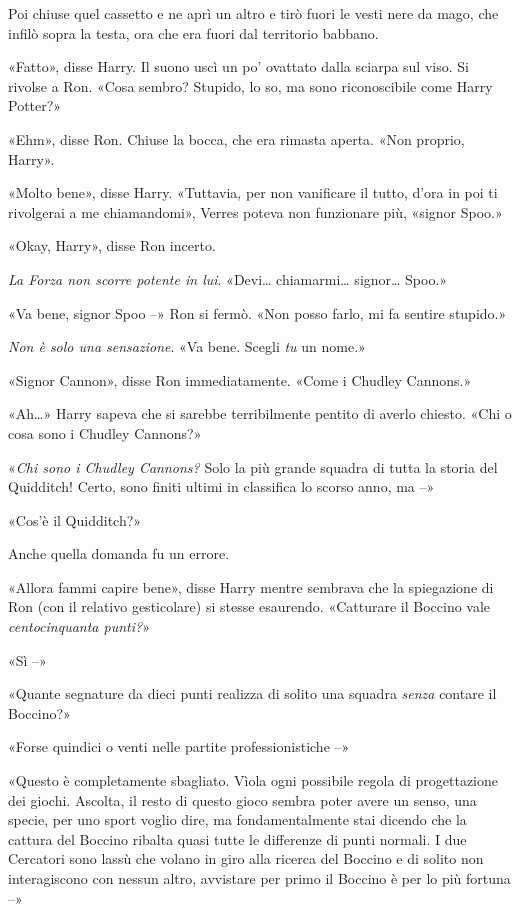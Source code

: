Poi chiuse quel cassetto e ne aprì un altro e tirò fuori le vesti nere da mago, che infilò sopra la testa, ora che era fuori dal territorio babbano.

«Fatto», disse Harry. Il suono uscì un po’ ovattato dalla sciarpa sul viso. Si rivolse a Ron. «Cosa sembro? Stupido, lo so, ma sono riconoscibile come Harry Potter?»

«Ehm», disse Ron. Chiuse la bocca, che era rimasta aperta. «Non proprio, Harry».

«Molto bene», disse Harry. «Tuttavia, per non vanificare il tutto, d’ora in poi ti rivolgerai a me chiamandomi», Verres poteva non funzionare più, «signor Spoo.»

«Okay, Harry», disse Ron incerto.

\textit{La Forza non scorre potente in lui}. «Devi… chiamarmi… signor… Spoo.»

«Va bene, signor Spoo –» Ron si fermò. «Non posso farlo, mi fa sentire stupido.»

\textit{Non è solo una sensazione}. «Va bene. Scegli \textit{tu} un nome.»

«Signor Cannon», disse Ron immediatamente. «Come i Chudley Cannons.»

«Ah…» Harry sapeva che si sarebbe terribilmente pentito di averlo chiesto. «Chi o cosa sono i Chudley Cannons?»

«\textit{Chi sono i Chudley Cannons?} Solo la più grande squadra di tutta la storia del Quidditch! Certo, sono finiti ultimi in classifica lo scorso anno, ma –»

«Cos’è il Quidditch?»

Anche quella domanda fu un errore.

«Allora fammi capire bene», disse Harry mentre sembrava che la spiegazione di Ron (con il relativo gesticolare) si stesse esaurendo. «Catturare il Boccino vale \textit{centocinquanta punti?}»

«Sì –»

«Quante segnature da dieci punti realizza di solito una squadra \textit{senza} contare il Boccino?»

«Forse quindici o venti nelle partite professionistiche –»

«Questo è completamente sbagliato. Vìola ogni possibile regola di progettazione dei giochi. Ascolta, il resto di questo gioco sembra poter avere un senso, una specie, per uno sport voglio dire, ma fondamentalmente stai dicendo che la cattura del Boccino ribalta quasi tutte le differenze di punti normali. I due Cercatori sono lassù che volano in giro alla ricerca del Boccino e di solito non interagiscono con nessun altro, avvistare per primo il Boccino è per lo più fortuna –»

